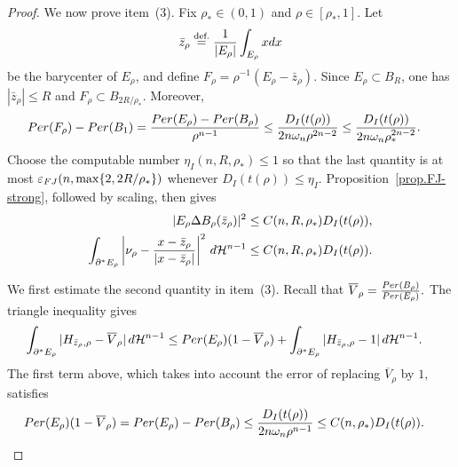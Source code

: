 \documentclass[10pt,a4paper]{amsart}
\newcommand\Per{\mathop{\rm Per}}
\newcommand{\dHn}{\,\dd\mathcal{H}^{n-1}}
\def\dd{{\rm d}}
\newcommand{\eqdef}{\overset{\text{def.}}{=}}
\begin{document}
\begin{proof}
We now prove item~(3). Fix $\rho_*\in(0,1)$ and
$\rho\in[\rho_*,1]$. Let
\[
 \bar z_\rho\eqdef\frac{1}{|E_\rho|}\int_{E_\rho}x\dd x
\]
be the barycenter of $E_\rho$, and define
$F_\rho=\rho^{-1}(E_\rho-\bar z_\rho)$. Since
$E_\rho\subset B_R$, one has $|\bar z_\rho|\le R$ and
$F_\rho\subset B_{2R/\rho_*}$. Moreover,
\begin{align}\label{eq.normalized_perimeter_deficit}
 \Per(F_\rho)-\Per(B_1)
 &=\frac{\Per(E_\rho)-\Per(B_\rho)}{\rho^{n-1}}
  \le\frac{D_I(t(\rho))}{2n\omega_n\rho^{2n-2}}
 \le\frac{D_I(t(\rho))}{2n\omega_n\rho_*^{2n-2}}.
\end{align}
Choose the computable number $\eta_I(n,R,\rho_*)\le1$ so that the last
quantity is at most
$\varepsilon_{\rm FJ}(n,\max\{2,2R/\rho_*\})$ whenever
$D_I(t(\rho))\le\eta_I$. Proposition~\ref{prop.FJ-strong}, followed by
scaling, then gives
\begin{align}
 |E_\rho\Delta B_\rho(\bar z_\rho)|^2
 &\le C(n,R,\rho_*)D_I(t(\rho)),
 \label{eq.local_FJ_volume}\\
 \int_{\partial^*E_\rho}
 \left|\nu_\rho-\frac{x-\bar z_\rho}{|x-\bar z_\rho|}\right|^2\dHn
 &\le C(n,R,\rho_*)D_I(t(\rho)).
 \label{eq.local_FJ_normal}
\end{align}

We first estimate the second quantity in item~(3). Recall that
$
 \overline V_\rho=\frac{\Per(B_\rho)}{\Per(E_\rho)}.
$
The triangle inequality gives
\begin{align*}
 \int_{\partial^*E_\rho}
 |H_{\bar z_\rho,\rho}-\overline V_\rho|\dHn
 &\le \Per(E_\rho)(1-\overline V_\rho)
 +\int_{\partial^*E_\rho}|H_{\bar z_\rho,\rho}-1|\dHn.
\end{align*}
The first term above, which takes into account the error of replacing
$\overline V_\rho$ by $1$, satisfies
\begin{align*}
 \Per(E_\rho)(1-\overline V_\rho)
 &=\Per(E_\rho)-\Per(B_\rho)
 \le\frac{D_I(t(\rho))}{2n\omega_n\rho^{n-1}}
 \le C(n,\rho_*)D_I(t(\rho)).
\end{align*}


\end{proof}
\end{document}
